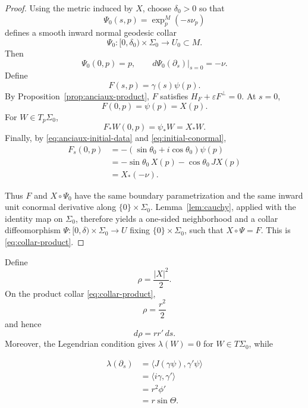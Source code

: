 \documentclass[11pt,a4paper]{article}
\numberwithin{equation}{section}
\begin{document}
\begin{proof}
Using the metric induced by $X$, choose $\delta_0>0$ so that
$$
        \Psi_0(s,p)=\exp_p^M(-s\nu_p)
$$
defines a smooth inward normal geodesic collar
$$
        \Psi_0:[0,\delta_0)\times\Sigma_0\longrightarrow U_0\subset M.
$$
Then
$$
        \Psi_0(0,p)=p,
        \qquad
        d\Psi_0(\partial_s)|_{s=0}=-\nu.
$$
Define
$$
        F(s,p)=\gamma(s)\psi(p).
$$
By Proposition~\ref{prop:anciaux-product}, $F$ satisfies $H_F+\varepsilon F^\perp=0$.  At $s=0$,
$$
        F(0,p)=\psi(p)=X(p).
$$
For $W\in T_p\Sigma_0$,
$$
        F_*W(0,p)=\psi_*W=X_*W.
$$
Finally, by \eqref{eq:anciaux-initial-data} and \eqref{eq:initial-conormal},
\begin{equation*}
\begin{aligned}
     F_s(0,p)
        &=-(\sin\theta_0+i\cos\theta_0)\psi(p)\\
        &=-\sin\theta_0\,X(p)-\cos\theta_0\,JX(p)\\
        &=X_*(-\nu).
\end{aligned}
\end{equation*}
       
Thus $F$ and $X\circ\Psi_0$ have the same boundary parametrization 
and the same inward unit conormal derivative along $\{0\}\times\Sigma_0$.   Lemma~\ref{lem:cauchy}, applied
with the identity map on $\Sigma_0$,  
therefore yields a one-sided neighborhood and 
a collar diffeomorphism $\Psi:[0,\delta)\times\Sigma_0\to U$ fixing $\{0\}\times \Sigma_0$, such that $X\circ \Psi=F$. This is \eqref{eq:collar-product}.
\end{proof}


Define
\begin{equation*}
        \rho=\frac{|X|^2}{2}.
\end{equation*}
On the product collar \eqref{eq:collar-product},
$$
        \rho=\frac{r^2}{2}
$$
and hence
\begin{equation}\label{eq:drho-collar}
        d\rho=rr'\,ds.
\end{equation}
Moreover, the Legendrian condition gives $\lambda(W)=0$ for $W\in T\Sigma_0$, while

\begin{equation*}
\begin{aligned}
        \lambda(\partial_s)
        &=\langle J(\gamma\psi),\gamma'\psi\rangle\\
        &=\langle i\gamma,\gamma'\rangle\\
        &=r^2\phi'\\
        &=r\sin\Theta.
\end{aligned}
\end{equation*}
\end{document}
